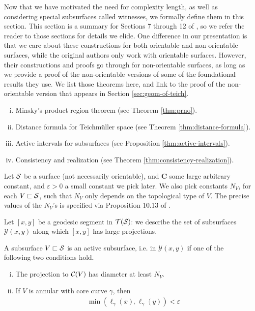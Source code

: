 \documentclass[12pt, reqno]{amsart}
\begin{document}
Now that we have motivated the need for complexity length, as well as considering special subsurfaces called witnesses, we formally define them in this section.
This section is a summary for Sections 7 through 12 of \textcite{dowdall2023lattice}, so we refer the reader to those sections for details we elide.
One difference in our presentation is that we care about these constructions for both orientable and non-orientable surfaces, while the original authors only work with orientable surfaces.
However, their constructions and proofs go through for non-orientable surfaces, as long as we provide a proof of the non-orientable versions of some of the foundational results they use.
We list those theorems here, and link to the proof of the non-orientable version that appears in Section \ref{sec:geom-of-teich}.
\begin{enumerate}[(i)]
\item Minsky's product region theorem (see Theorem \ref{thm:prno}).
\item Distance formula for Teichmüller space (see Theorem \ref{thm:distance-formula}).
\item Active intervals for subsurfaces (see Proposition \ref{thm:active-intervals}).
\item Consistency and realization (see Theorem \ref{thm:consistency-realization}).
\end{enumerate}

Let $\mathcal{S}$ be a surface (not necessarily orientable), and $\mathbf{C}$ some large arbitrary constant, and $\varepsilon > 0$ a small constant we pick later.
We also pick constants $N_V$, for each $V \sqsubset \mathcal{S}$, such that $N_V$ only depends on the topological type of $V$.
The precise values of the $N_V$'s is specified via Proposition 10.13 of \cite{dowdall2023lattice}.

Let $[x,y]$ be a geodesic segment in $\mathcal{T}(\mathcal{S})$: we describe the set of subsurfaces $\mathcal{Y}(x, y)$ along which $[x, y]$ has large projections.

\begin{definition}
  A subsurface $V \sqsubset \mathcal{S}$ is an active subsurface, i.e. in $\mathcal{Y}(x,y)$ if one of the following two conditions hold.
  \begin{enumerate}[(i)]
  \item The projection to $\mathcal{C}(V)$ has diameter at least $N_V$.
  \item If $V$ is annular with core curve $\gamma$, then
    \begin{align*}
      \min\left( \ell_\gamma(x), \ell_{\gamma}(y) \right) < \varepsilon
    \end{align*}
  \end{enumerate}
\end{definition}
\end{document}
